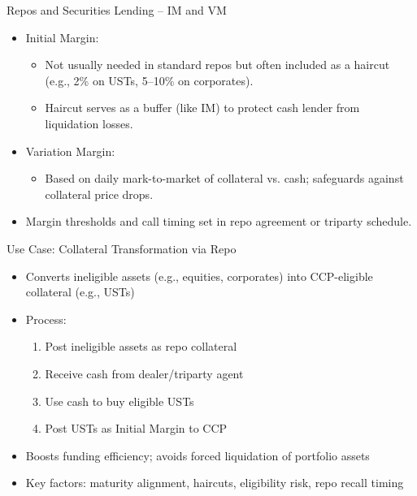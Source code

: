 \documentclass[handout, aspectratio=169]{beamer}
\begin{document}
\begin{frame}{Repos and Securities Lending – IM and VM}
  \begin{itemize}
    \item Initial Margin:
    \begin{itemize}
      \item Not usually needed in standard repos but often included as a haircut (e.g., 2\% on USTs, 5–10\% on corporates).
      \item Haircut serves as a buffer (like IM) to protect cash lender from liquidation losses.
    \end{itemize}
    \item Variation Margin:
    \begin{itemize}
      \item Based on daily mark-to-market of collateral vs. cash; safeguards against collateral price drops.
    \end{itemize}
    \item Margin thresholds and call timing set in repo agreement or triparty schedule.
  \end{itemize}
\end{frame}

\begin{frame}{Use Case: Collateral Transformation via Repo}
  \begin{itemize}
    \item Converts ineligible assets (e.g., equities, corporates) into CCP-eligible collateral (e.g., USTs)
    \item Process:
    \begin{enumerate}
      \item Post ineligible assets as repo collateral
      \item Receive cash from dealer/triparty agent
      \item Use cash to buy eligible USTs
      \item Post USTs as Initial Margin to CCP
    \end{enumerate}
    \item Boosts funding efficiency; avoids forced liquidation of portfolio assets
    \item Key factors: maturity alignment, haircuts, eligibility risk, repo recall timing
  \end{itemize}
\end{frame}
\end{document}

